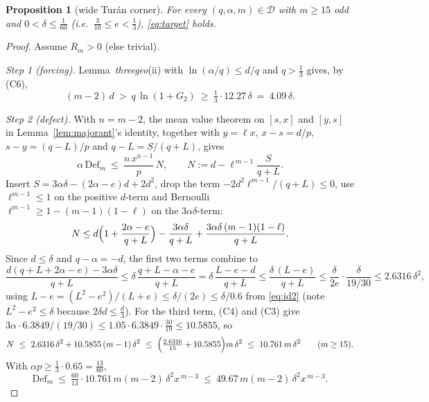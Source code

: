 \documentclass[11pt]{amsart}
\newtheorem{proposition}[theorem]{Proposition}
\newcommand{\D}{\mathcal D}
\begin{document}
\begin{proposition}[wide Tur\'an corner]\label{prop:wide}
For every $(q,\alpha,m)\in\D$ with $m\ge15$ odd and
$0<\delta\le\tfrac1{60}$ (i.e.\ $\tfrac3{10}\le e<\tfrac13$),
\eqref{eq:target} holds.
\end{proposition}

\begin{proof}
Assume $R_m>0$ (else trivial).

\emph{Step 1 (forcing).}  Lemma~\emph{threegeo}(ii) with
$\ln(\alpha/q)\le d/q$ and $q>\tfrac13$ gives, by (C6),
\begin{equation}\label{eq:wide-forcing}
 (m-2)\,d\ >\ q\,\ln(1+G_2)\ \ge\ \tfrac13\cdot12.27\,\delta\ =\ 4.09\,\delta .
\end{equation}

\emph{Step 2 (defect).}  With $n=m-2$, the mean value theorem on
$[s,x]$ and $[y,s]$ in Lemma~\ref{lem:majorant}'s identity, together with
$y=\ell x$, $x-s=d/p$, $s-y=(q-L)/p$ and $q-L=S/(q+L)$, gives
\[
 \alpha\,\mathrm{Def}_m\ \le\ \frac{n\,x^{n-1}}p\,N,
 \qquad
 N:=d-\ell^{\,m-1}\frac S{q+L}.
\]
Insert $S=3\alpha\delta-(2\alpha-e)d+2d^2$, drop the term
$-2d^2\ell^{m-1}/(q+L)\le0$, use $\ell^{m-1}\le1$ on the positive $d$-term
and Bernoulli $\ell^{m-1}\ge1-(m-1)(1-\ell)$ on the $3\alpha\delta$-term:
\[
 N\le d\Bigl(1+\frac{2\alpha-e}{q+L}\Bigr)-\frac{3\alpha\delta}{q+L}
 +\frac{3\alpha\delta\,(m-1)(1-\ell)}{q+L}.
\]
Since $d\le\delta$ and $q-\alpha=-d$, the first two terms combine to
\[
 \frac{d(q+L+2\alpha-e)-3\alpha\delta}{q+L}
 \le\delta\,\frac{q+L-\alpha-e}{q+L}
 =\delta\,\frac{L-e-d}{q+L}
 \le\frac{\delta\,(L-e)}{q+L}
 \le\frac{\delta}{2e}\cdot\frac{\delta}{19/30}
 \le2.6316\,\delta^2,
\]
using $L-e=(L^2-e^2)/(L+e)\le\delta/(2e)\le\delta/0.6$ from \eqref{eq:id2}
(note $L^2-e^2\le\delta$ because $2\delta d\le\tfrac d3$).  For the third
term, (C4) and (C3) give
$3\alpha\cdot6.3849/(19/30)\le1.05\cdot6.3849\cdot\tfrac{30}{19}
\le10.5855$, so
\[
 N\ \le\ 2.6316\,\delta^2+10.5855\,(m-1)\,\delta^2
 \ \le\ \Bigl(\tfrac{2.6316}{15}+10.5855\Bigr)m\,\delta^2
 \ \le\ 10.761\,m\,\delta^2 \qquad(m\ge15).
\]
With $\alpha p\ge\tfrac13\cdot0.65=\tfrac{13}{60}$,
\begin{equation}\label{eq:wide-defect}
 \mathrm{Def}_m\ \le\ \tfrac{60}{13}\cdot10.761\,m(m-2)\,\delta^2x^{\,m-3}
 \ \le\ 49.67\,m(m-2)\,\delta^2x^{\,m-3}.
\end{equation}


\end{proof}
\end{document}
